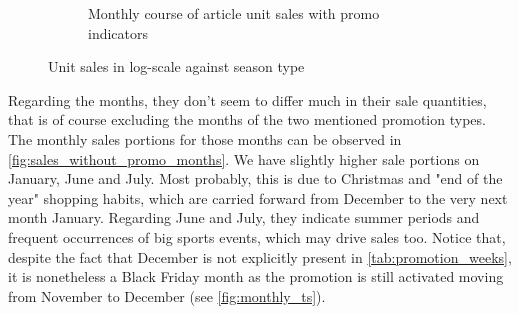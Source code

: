 \begin{figure}[H]
\begin{subfigure}{.45\textwidth}
  \caption{Monthly course of article unit sales with promo indicators}
  \label{fig:season_type_against_logsales}
\end{subfigure}
\caption{Unit sales in log-scale against season type}
\label{fig:log_sales_vs_markdown_and_season_type}
\end{figure}




Regarding the months, they don't seem to differ much in their sale quantities, that is of course excluding the months of the two mentioned promotion types. The monthly sales portions for those months can be observed in \autoref{fig:sales_without_promo_months}. We have slightly higher sale portions on January, June and July. 
Most probably, this is due to Christmas and "end of the year" shopping habits, which are carried forward from December to the very next month January. 
Regarding June and July, they indicate summer periods and frequent occurrences of big sports events, which may drive sales too. 
Notice that, despite the fact that December is not explicitly present in \autoref{tab:promotion_weeks}, it is nonetheless a Black Friday month as the promotion is still activated moving from November to December (see \autoref{fig:monthly_ts}). 
\\



